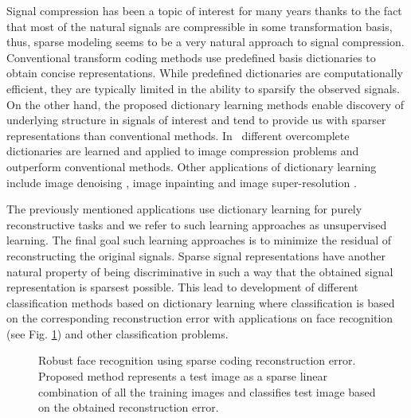 \documentclass[journal]{IEEEtran}
\begin{document}
Signal compression has been a topic of interest for many years thanks to the fact that most of the natural signals are compressible in some transformation basis, thus, sparse modeling seems to be a very natural approach to signal compression. Conventional transform coding methods use predefined basis dictionaries to obtain concise representations. While predefined dictionaries are computationally efficient, they are typically limited in the ability to sparsify the observed signals. On the other hand, the proposed dictionary learning methods enable discovery of underlying structure in signals of interest and tend to provide us with sparser representations than conventional methods. In~\cite{nejati2016boosted, horev2012adaptive, skretting2011image} different overcomplete dictionaries are learned and applied to image compression problems and outperform conventional methods. Other applications of dictionary learning include image denoising \cite{Elad2008}, image inpainting \cite{Shen2009, Mairal2008} and image super-resolution \cite{yang2010image, kim2010single, yang2008image}.

The previously mentioned applications use dictionary learning for purely reconstructive tasks and we refer to such learning approaches as unsupervised learning. The final goal such learning approaches is to minimize the residual of reconstructing the original signals. Sparse signal representations have another natural property of being discriminative in such a way that the obtained signal representation is sparsest possible. This lead to development of different classification methods based on dictionary learning where classification is based on the corresponding reconstruction error \cite{Zhang2010, ZhuolinJiang2013} with applications on face recognition \cite{Wright2009_src} (see Fig. \ref{fig:face_recognition}) and other classification problems.
%
\begin{figure}[h]
	\centering
		
	\caption{Robust face recognition using sparse coding reconstruction error. Proposed method represents a test image as a sparse linear combination of all the training images and classifies test image based on the obtained reconstruction error. \cite{Wright2009_src}}
	
	\label{fig:face_recognition}
\end{figure}
\end{document}
